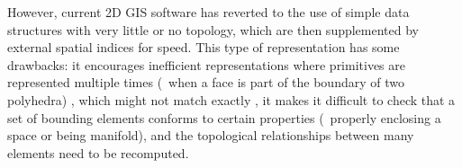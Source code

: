 
However, current 2D GIS software has reverted to the use of simple data structures with very little or no topology, which are then supplemented by external spatial indices for speed.
This type of representation has some drawbacks: it encourages inefficient representations where primitives are represented multiple times (\eg\ when a face is part of the boundary of two polyhedra) \citep[Ch.~3]{Cromley92}, which might not match exactly \citep{delaLosa99}, it makes it difficult to check that a set of bounding elements conforms to certain properties (\eg\ properly enclosing a space or being manifold), and the topological relationships between many elements need to be recomputed.

